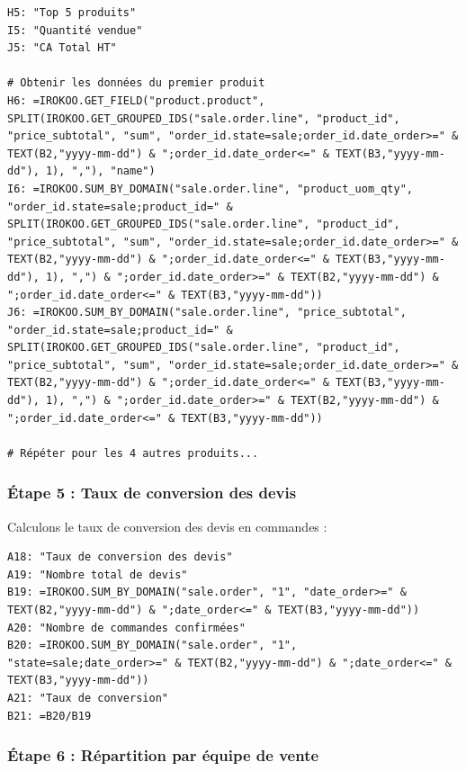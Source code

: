 \documentclass[12pt, a4paper]{article}
\begin{document}
\begin{lstlisting}
H5: "Top 5 produits"
I5: "Quantité vendue"
J5: "CA Total HT"

# Obtenir les données du premier produit
H6: =IROKOO.GET_FIELD("product.product", SPLIT(IROKOO.GET_GROUPED_IDS("sale.order.line", "product_id", "price_subtotal", "sum", "order_id.state=sale;order_id.date_order>=" & TEXT(B2,"yyyy-mm-dd") & ";order_id.date_order<=" & TEXT(B3,"yyyy-mm-dd"), 1), ","), "name")
I6: =IROKOO.SUM_BY_DOMAIN("sale.order.line", "product_uom_qty", "order_id.state=sale;product_id=" & SPLIT(IROKOO.GET_GROUPED_IDS("sale.order.line", "product_id", "price_subtotal", "sum", "order_id.state=sale;order_id.date_order>=" & TEXT(B2,"yyyy-mm-dd") & ";order_id.date_order<=" & TEXT(B3,"yyyy-mm-dd"), 1), ",") & ";order_id.date_order>=" & TEXT(B2,"yyyy-mm-dd") & ";order_id.date_order<=" & TEXT(B3,"yyyy-mm-dd"))
J6: =IROKOO.SUM_BY_DOMAIN("sale.order.line", "price_subtotal", "order_id.state=sale;product_id=" & SPLIT(IROKOO.GET_GROUPED_IDS("sale.order.line", "product_id", "price_subtotal", "sum", "order_id.state=sale;order_id.date_order>=" & TEXT(B2,"yyyy-mm-dd") & ";order_id.date_order<=" & TEXT(B3,"yyyy-mm-dd"), 1), ",") & ";order_id.date_order>=" & TEXT(B2,"yyyy-mm-dd") & ";order_id.date_order<=" & TEXT(B3,"yyyy-mm-dd"))

# Répéter pour les 4 autres produits...
\end{lstlisting}

\subsubsection{Étape 5 : Taux de conversion des devis}

Calculons le taux de conversion des devis en commandes :

\begin{lstlisting}
A18: "Taux de conversion des devis"
A19: "Nombre total de devis"
B19: =IROKOO.SUM_BY_DOMAIN("sale.order", "1", "date_order>=" & TEXT(B2,"yyyy-mm-dd") & ";date_order<=" & TEXT(B3,"yyyy-mm-dd"))
A20: "Nombre de commandes confirmées"
B20: =IROKOO.SUM_BY_DOMAIN("sale.order", "1", "state=sale;date_order>=" & TEXT(B2,"yyyy-mm-dd") & ";date_order<=" & TEXT(B3,"yyyy-mm-dd"))
A21: "Taux de conversion"
B21: =B20/B19
\end{lstlisting}

\subsubsection{Étape 6 : Répartition par équipe de vente}
\end{document}
